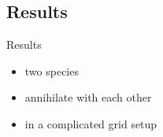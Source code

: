 \documentclass[t,mathserif]{beamer}
\begin{document}
\subsection{Results}
\begin{frame}[allowpagebreaks]{Results}
\begin{itemize}
	\item two species
	\item annihilate with each other
	\item in a complicated grid setup
\end{itemize}
\end{frame}
\end{document}
